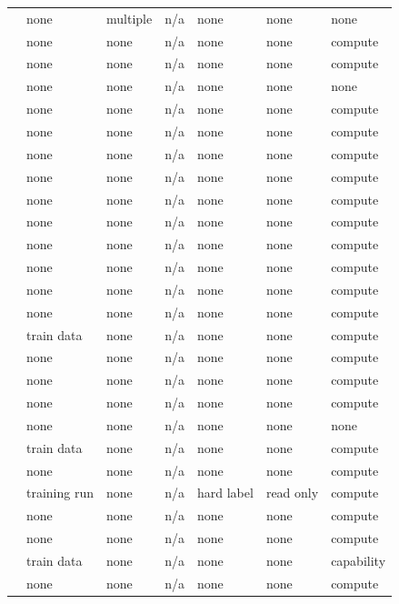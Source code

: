 \begin{landscape}
\begin{longtable}{rllllll}
\cite{PMSW18} & none & multiple & n/a & none & none & none \\
\cite{KMNS21} & none & none & n/a & none & none & compute \\
\cite{HBEORGATS24} & none & none & n/a & none & none & compute \\
\cite{AGK22} & none & none & n/a & none & none & none \\
\cite{DQW22} & none & none & n/a & none & none & compute \\
\cite{BRSV17} & none & none & n/a & none & none & compute \\
\cite{DLSW25} & none & none & n/a & none & none & compute \\
\cite{BAHSWZ22} & none & none & n/a & none & none & compute \\
\cite{BHKKMP16} & none & none & n/a & none & none & compute \\
\cite{BJRZ24} & none & none & n/a & none & none & compute \\
\cite{GZ19} & none & none & n/a & none & none & compute \\
\cite{BBHLS21} & none & none & n/a & none & none & compute \\
\cite{BRST21} & none & none & n/a & none & none & compute \\
\cite{BCEQ24} & none & none & n/a & none & none & compute \\
\cite{CIM19} & train data & none & n/a & none & none & compute \\
\cite{HMSTY25} & none & none & n/a & none & none & compute \\
\cite{MR26} & none & none & n/a & none & none & compute \\
\cite{HBMBCRCHWCHNMDDGOSERVS22} & none & none & n/a & none & none & compute \\
\cite{BEBY24} & none & none & n/a & none & none & none \\
\cite{MPRV09} & train data & none & n/a & none & none & compute \\
\cite{PPXP24} & none & none & n/a & none & none & compute \\
\cite{CK21} & training run & none & n/a & hard label & read only & compute \\
\cite{ABIKN23} & none & none & n/a & none & none & compute \\
\cite{SGSGM22} & none & none & n/a & none & none & compute \\
\cite{ACGMMTZ16} & train data & none & n/a & none & none & capability \\
\cite{BJ23} & none & none & n/a & none & none & compute \\

\end{longtable}
\end{landscape}
